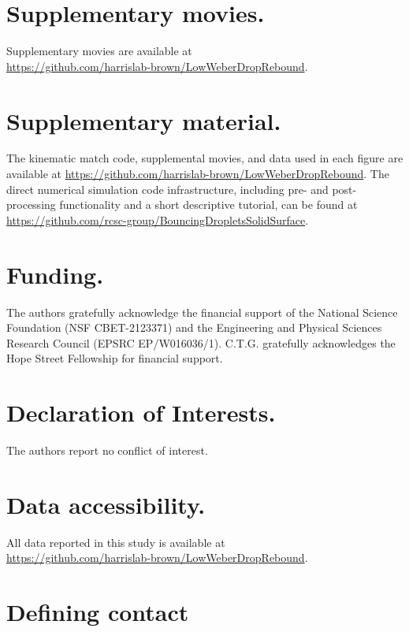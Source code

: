 \documentclass{jfm}
\begin{document}
\section*{Supplementary movies.} Supplementary movies are available at \\ \url{https://github.com/harrislab-brown/LowWeberDropRebound}. 

\section*{Supplementary material.}
The kinematic match code, supplemental movies, and data used in each figure are available at \url{https://github.com/harrislab-brown/LowWeberDropRebound}. The direct numerical simulation code infrastructure, including pre- and post-processing functionality and a short descriptive tutorial, can be found at \\ \url{https://github.com/rcsc-group/BouncingDropletsSolidSurface}.

\section*{Funding.}
The authors gratefully acknowledge the financial support of the National Science Foundation (NSF CBET-2123371) and the Engineering and Physical Sciences Research Council (EPSRC EP/W016036/1).  C.T.G. gratefully acknowledges the Hope Street Fellowship for financial support. 

\section*{Declaration of Interests.}
The authors report no conflict of interest.

\section*{Data accessibility.}
All data reported in this study is available at \\ \url{https://github.com/harrislab-brown/LowWeberDropRebound}. 

\appendix

\section{Defining contact}\label{appA}
\end{document}
